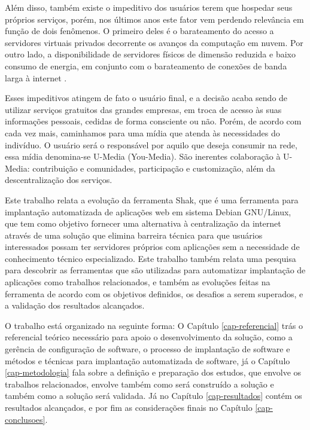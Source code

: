 Além disso, também existe o impeditivo dos usuários terem que hospedar seus próprios serviços,
porém, nos últimos anos este fator vem perdendo relevância em função de
dois fenômenos. O primeiro deles é o barateamento do acesso a servidores virtuais
privados decorrente os avanços da computação em nuvem. Por outro lado, a
disponibilidade de servidores físicos de dimensão reduzida e baixo consumo de
energia, em conjunto com o barateamento de conexões de banda larga à internet \cite{shak2015}.

Esses impeditivos atingem de fato o usuário final, e a decisão
acaba sendo de utilizar serviços gratuitos das grandes empresas, em troca de acesso
às suas informações pessoais, cedidas de forma consciente ou não. Porém, de acordo
com \cite{terra2006comunicaccao} cada vez mais, caminhamos
para uma mídia que atenda às necessidades do indivíduo. O usuário será o responsável
por aquilo que deseja consumir na rede, essa mídia denomina-se U-Media (You-Media).
São inerentes colaboração à U-Media: contribuição e comunidades, participação
e customização, além da descentralização dos serviços.

Este trabalho relata a evolução da ferramenta Shak, que é uma ferramenta para implantação
automatizada de aplicações web em sistema Debian GNU/Linux, que tem como objetivo fornecer
uma alternativa à centralização da internet através de uma solução que elimina
barreira técnica para que usuários interessados possam ter servidores próprios
com aplicações sem a necessidade de conhecimento
técnico especializado. Este trabalho também relata uma pesquisa para
descobrir as ferramentas que são utilizadas para automatizar implantação de aplicações
como trabalhos relacionados, e também as evoluções feitas na ferramenta de acordo
com os objetivos definidos, os desafios a serem superados, e a validação dos
resultados alcançados.

O trabalho está organizado na seguinte forma: O Capítulo \ref{cap-referencial}
trás o referencial teórico necessário para apoio o desenvolvimento da solução,
como a gerência de configuração de software, o processo de implantação de software
 e métodos e técnicas para implantação automatizada de software, já o Capítulo
\ref{cap-metodologia}
fala sobre a definição e preparação dos estudos, que envolve os trabalhos relacionados,
envolve também como será construído a solução e também como a solução será validada.
Já no Capítulo \ref{cap-resultados} contém os resultados alcançados, e por fim as
considerações finais no Capítulo \ref{cap-conclusoes}.

